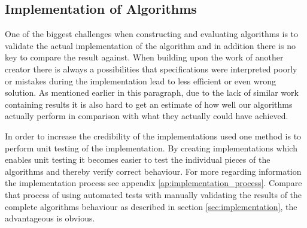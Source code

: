 \subsection{Implementation of Algorithms }
One of the biggest challenges when constructing and evaluating algorithms is to validate the actual implementation of the algorithm and in addition there is no key to compare the result against. When building upon the work of another creator there is always a possibilities that specifications were interpreted poorly or mistakes during the implementation lead to less efficient or even wrong solution. As mentioned earlier in this paragraph, due to the lack of similar work containing results it is also hard to get an estimate of how well our algorithms actually perform in comparison with what they actually could have achieved. 

In order to increase the credibility of the implementations used one method is to perform unit testing of the implementation. By creating implementations which enables unit testing it becomes easier to test the individual pieces of the algorithms and thereby verify correct behaviour. For more regarding information the implementation process see appendix \ref{ap:implementation_process}. Compare that process of using automated tests with manually validating the results of the complete algorithms behaviour as described in section \ref{sec:implementation}, the advantageous is obvious. 
